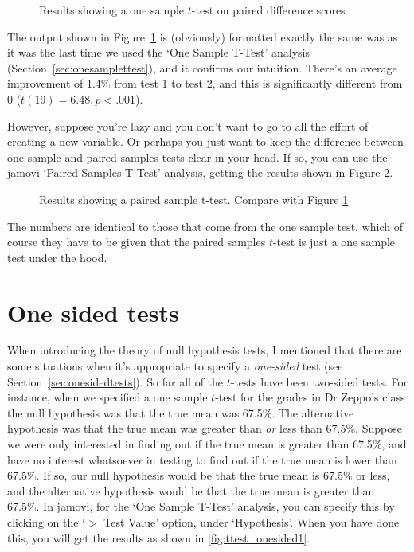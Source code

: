 \begin{figure}[htb]
\begin{center}
\caption{Results showing a one sample $t$-test on paired difference scores}
\label{fig:ttest_paired2}
\HR
\end{center}
\end{figure}

The output shown in Figure~\ref{fig:ttest_paired2} is (obviously) formatted exactly the same was as it was the last time we used the `One Sample T-Test' analysis (Section~\ref{sec:onesamplettest}), and it confirms our intuition. There's an average improvement of 1.4\% from test 1 to test 2, and this is significantly different from 0 ($t(19)=6.48, p<.001$). 

However, suppose you're lazy and you don't want to go to all the effort of creating a new variable. Or perhaps you just want to keep the difference between one-sample and paired-samples tests clear in your head. If so, you can use the jamovi `Paired Samples T-Test' analysis, getting the results shown in Figure \ref{fig:ttest_paired3}.

\begin{figure}[htb]
\begin{center}
\caption{Results showing a paired sample t-test. Compare with Figure \ref{fig:ttest_paired2}}
\label{fig:ttest_paired3}
\HR
\end{center}
\end{figure}

The numbers are identical to those that come from the one sample test, which of course they have to be given that the paired samples $t$-test is just a one sample test under the hood. 


\section{One sided tests~\label{sec:onesidedttest}}

When introducing the theory of null hypothesis tests, I mentioned that there are some situations when it's appropriate to specify a {\it one-sided} test (see Section~\ref{sec:onesidedtests}). So far all of the $t$-tests have been two-sided tests. For instance, when we specified a one sample $t$-test for the grades in Dr Zeppo's class the null hypothesis was that the true mean was 67.5\%. The alternative hypothesis was that the true mean was greater than {\it or} less than 67.5\%. Suppose we were only interested in finding out if the true mean is greater than 67.5\%, and have no interest whatsoever in testing to find out if the true mean is lower than 67.5\%. If so, our null hypothesis would be that the true mean is 67.5\% or less, and the alternative hypothesis would be that the true mean is greater than 67.5\%. In jamovi, for the `One Sample T-Test' analysis, you can specify this by clicking on the `$>$ Test Value' option, under `Hypothesis'. When you have done this, you will get the results as shown in \ref{fig:ttest_onesided1}.

